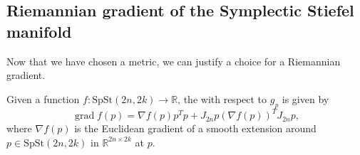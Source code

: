 \subsection{Riemannian gradient of the Symplectic Stiefel manifold}
Now that we have chosen a metric, we can justify a choice for a Riemannian gradient. 
\begin{proposition}
    Given a function $f\colon \mathrm{SpSt}(2n, 2k)\xrightarrow{}\mathbb{R}$, the  with respect to $g_{p}$ is given by
    \begin{equation}\label{eq:rie_grad}
        \operatorname{grad}f(p)=\nabla f(p)p^{T}p+J_{2n}p(\nabla f(p))^{T}J_{2n}p,
    \end{equation}
    where $\nabla f(p)$ is the Euclidean gradient of a smooth extension around $p\in \mathrm{SpSt}(2n, 2k)$ in $\mathbb{R}^{2n\times2k}$ at $p$.
\end{proposition}
